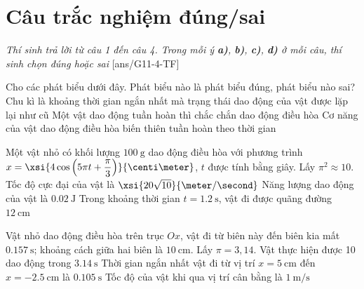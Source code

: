 \section{Câu trắc nghiệm đúng/sai} 
\textit{Thí sinh trả lời từ câu 1 đến câu 4. Trong mỗi ý \textbf{a)}, \textbf{b)}, \textbf{c)}, \textbf{d)} ở mỗi câu, thí sinh chọn đúng hoặc sai}
\setcounter{ex}{0}
[ans/G11-4-TF]
\begin{ex}
	Cho các phát biểu dưới đây. Phát biểu nào là phát biểu đúng, phát biểu nào sai?
	{\True Chu kì là khoảng thời gian ngắn nhất mà trạng thái dao động của vật được lặp lại như cũ}
	{Một vật dao động tuần hoàn thì chắc chắn dao động điều hòa}
	{Cơ năng của vật dao động điều hòa biến thiên tuần hoàn theo thời gian}
	\loigiai{}
\end{ex}
\begin{ex}
	Một vật nhỏ có khối lượng $\SI{100}{\gram}$ dao động điều hòa với phương trình $x=\xsi{4\cos\left(5\pi t+\dfrac{\pi}{3}\right)}{\centi\meter}$, $t$ được tính bằng giây. Lấy $\pi^2\approx10$.
	{Tốc độ cực đại của vật là  $\xsi{20\sqrt{10}}{\meter/\second}$}
	{\True Năng lượng dao động của vật là $\SI{0.02}{\joule}$}
	{Trong khoảng thời gian $t =\SI{1.2}{\second}$, vật đi được quãng đường $\SI{12}{\centi\meter}$}
	\loigiai{}
\end{ex}
\begin{ex}
	Vật nhỏ dao động điều hòa trên trục $Ox$, vật đi từ biên này đến biên kia mất $\SI{0.157}{\second}$; khoảng cách giữa hai biên là $\SI{10}{\centi\meter}$. Lấy $\pi=3,14$.
	{\True Vật thực hiện được 10 dao động trong $\SI{3.14}{\second}$}
	{\True Thời gian ngắn nhất vật đi từ vị trí $x =\SI{5}{\centi\meter}$ đến $x =\SI{-2.5}{\centi\meter}$ là $\SI{0.105}{\second}$}
	{\True Tốc độ của vật khi qua vị trí cân bằng là $\SI{1}{\meter/\second}$}
	\loigiai{}
\end{ex}
